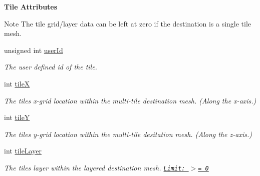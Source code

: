 \begin{Indent}\textbf{ Tile Attributes}\par
{\em \begin{DoxyNote}{Note}
The tile grid/layer data can be left at zero if the destination is a single tile mesh. 
\end{DoxyNote}
}\begin{DoxyCompactItemize}
\item 
\mbox{\label{structdtNavMeshCreateParams_aeb8e8fb9fed1e6f47292f5016f9eee0a}} 
unsigned int \hyperlink{structdtNavMeshCreateParams_aeb8e8fb9fed1e6f47292f5016f9eee0a}{user\+Id}
\begin{DoxyCompactList}\small\item\em The user defined id of the tile. \end{DoxyCompactList}\item 
\mbox{\label{structdtNavMeshCreateParams_ac3cd5e08f533bfd9767f70dd02f1cb33}} 
int \hyperlink{structdtNavMeshCreateParams_ac3cd5e08f533bfd9767f70dd02f1cb33}{tileX}
\begin{DoxyCompactList}\small\item\em The tile\textquotesingle{}s x-\/grid location within the multi-\/tile destination mesh. (Along the x-\/axis.) \end{DoxyCompactList}\item 
\mbox{\label{structdtNavMeshCreateParams_afc178088f515787cc8dec214559358e9}} 
int \hyperlink{structdtNavMeshCreateParams_afc178088f515787cc8dec214559358e9}{tileY}
\begin{DoxyCompactList}\small\item\em The tile\textquotesingle{}s y-\/grid location within the multi-\/tile desitation mesh. (Along the z-\/axis.) \end{DoxyCompactList}\item 
\mbox{\label{structdtNavMeshCreateParams_a537e0bee7d1ddf992dc540d46fa337de}} 
int \hyperlink{structdtNavMeshCreateParams_a537e0bee7d1ddf992dc540d46fa337de}{tile\+Layer}
\begin{DoxyCompactList}\small\item\em The tile\textquotesingle{}s layer within the layered destination mesh. \href{Along the y-axis.}{\tt Limit\+: $>$= 0} \end{DoxyCompactList}\item 

\end{DoxyCompactItemize}
\end{Indent}
